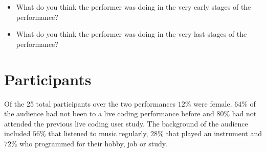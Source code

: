 \begin{itemize}
\item What do you think the performer was doing in the very early stages of the performance? 
\item What do you think the performer was doing in the very last stages of the performance? 
\end{itemize}





\section{Participants}

Of the 25 total participants over the two performances $12\%$ were female. $64\%$ of the audience had not been to a live coding performance before and $80\%$ had not attended the previous live coding user study. The background of the audience included $56\%$ that listened to music regularly, $28\%$ that played an instrument and $72\%$ who programmed for their hobby, job or study.

